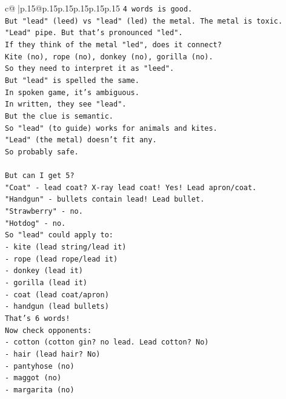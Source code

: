 \documentclass{article}
\begin{document}
{\begin{supertabular}{c@{$\;$}|p{.15\linewidth}@{}p{.15\linewidth}p{.15\linewidth}p{.15\linewidth}p{.15\linewidth}p{.15\linewidth}}
{{{\texttt{4 words is good.} \\
\texttt{But "lead" (leed) vs "lead" (led) the metal. The metal is toxic. "Lead" pipe. But that's pronounced "led".} \\
\texttt{If they think of the metal "led", does it connect?} \\
\texttt{Kite (no), rope (no), donkey (no), gorilla (no).} \\
\texttt{So they need to interpret it as "leed".} \\
\texttt{But "lead" is spelled the same.} \\
\texttt{In spoken game, it's ambiguous.} \\
\texttt{In written, they see "lead".} \\
\texttt{But the clue is semantic.} \\
\texttt{So "lead" (to guide) works for animals and kites.} \\
\texttt{"Lead" (the metal) doesn't fit any.} \\
\texttt{So probably safe.} \\
\\ 
\texttt{But can I get 5?} \\
\texttt{"Coat" {-} lead coat? X{-}ray lead coat! Yes! Lead apron/coat.} \\
\texttt{"Handgun" {-} bullets contain lead! Lead bullet.} \\
\texttt{"Strawberry" {-} no.} \\
\texttt{"Hotdog" {-} no.} \\
\texttt{So "lead" could apply to:} \\
\texttt{{-} kite (lead string/lead it)} \\
\texttt{{-} rope (lead rope/lead it)} \\
\texttt{{-} donkey (lead it)} \\
\texttt{{-} gorilla (lead it)} \\
\texttt{{-} coat (lead coat/apron)} \\
\texttt{{-} handgun (lead bullets)} \\
\texttt{That's 6 words!} \\
\texttt{Now check opponents:} \\
\texttt{{-} cotton (cotton gin? no lead. Lead cotton? No)} \\
\texttt{{-} hair (lead hair? No)} \\
\texttt{{-} pantyhose (no)} \\
\texttt{{-} maggot (no)} \\
\texttt{{-} margarita (no)} \\
}}}
\end{supertabular}}
\end{document}
